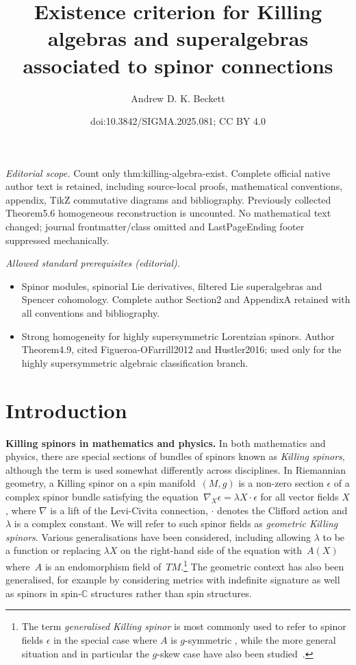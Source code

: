 \documentclass[10pt,a4paper]{amsart}
\title{Existence criterion for Killing algebras and superalgebras associated to spinor connections}
\author{Andrew D. K. Beckett}
\date{doi:10.3842/SIGMA.2025.081; CC BY 4.0}
\numberwithin{equation}{section}
\newcommand{\1}{\mathbbm{1}}
\begin{document}
\maketitle
\noindent\textit{Editorial scope.} Count only thm:killing-algebra-exist. Complete official native author text is retained, including source-local proofs, mathematical conventions, appendix, TikZ commutative diagrams and bibliography. Previously collected Theorem5.6 homogeneous reconstruction is uncounted. No mathematical text changed; journal frontmatter/class omitted and LastPageEnding footer suppressed mechanically.\par\medskip
\noindent\textit{Allowed standard prerequisites (editorial).}\begin{itemize}
\item Spinor modules, spinorial Lie derivatives, filtered Lie superalgebras and Spencer cohomology. Complete author Section2 and AppendixA retained with all conventions and bibliography.
\item Strong homogeneity for highly supersymmetric Lorentzian spinors. Author Theorem4.9, cited Figueroa-OFarrill2012 and Hustler2016; used only for the highly supersymmetric algebraic classification branch.
\end{itemize}\medskip
\section{Introduction}
\label{sec:intro}

{\bf Killing spinors in mathematics and physics.}
In both mathematics and physics, there are special sections of bundles of spinors known as \emph{Killing spinors}, although the term is used somewhat differently across disciplines. In Riemannian geometry, a Killing spinor on a spin manifold~$(M,g)$ is a non-zero section $\epsilon$ of a complex spinor bundle satisfying the equation~${\nabla_{\!X} \epsilon = \lambda X\!\cdot \epsilon
}$
for all vector fields $X$, where $\nabla$ is a lift of the Levi-Civita connection, $\cdot$ denotes the Clifford action and $\lambda$ is a complex constant. We will refer to such spinor fields as \emph{geometric Killing spinors}. Various generalisations have been considered, including allowing $\lambda$ to be a function \cite{Lichnerowicz1987} or replacing $\lambda X$ on the right-hand side of the equation with~$A(X)$ where~$A$ is an endomorphism field of~$TM$.\footnote{The term \emph{generalised Killing spinor} is most commonly used to refer to spinor fields $\epsilon$ in the special case where $A$ is $g$-symmetric \cite{Bar2005,Moroianu2014}, while the more general situation and in particular the $g$-skew case have also been studied~\cite{Habib2012}.}
The geometric context has also been generalised, for example by considering metrics with indefinite signature \cite{Bohle2003} as well as spinors in spin-$\mathbb{C}$ structures \cite{Moroianu1997} rather than spin structures.
\end{document}
